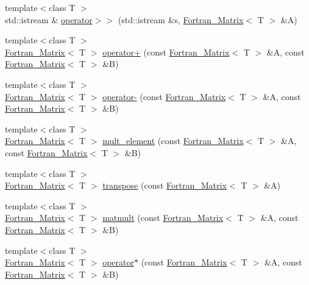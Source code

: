 \begin{DoxyCompactItemize}
{\footnotesize template$<$class T $>$ }\\std::istream \& \hyperlink{namespace_t_n_t_a06559afd57841f2cf098db8e64d36fa0}{operator$>$$>$} (std::istream \&s, \hyperlink{class_t_n_t_1_1_fortran___matrix}{Fortran\_\-Matrix}$<$ T $>$ \&A)
\item 
{\footnotesize template$<$class T $>$ }\\\hyperlink{class_t_n_t_1_1_fortran___matrix}{Fortran\_\-Matrix}$<$ T $>$ \hyperlink{namespace_t_n_t_a8025a7974a165fccf5457b055acfd543}{operator+} (const \hyperlink{class_t_n_t_1_1_fortran___matrix}{Fortran\_\-Matrix}$<$ T $>$ \&A, const \hyperlink{class_t_n_t_1_1_fortran___matrix}{Fortran\_\-Matrix}$<$ T $>$ \&B)
\item 
{\footnotesize template$<$class T $>$ }\\\hyperlink{class_t_n_t_1_1_fortran___matrix}{Fortran\_\-Matrix}$<$ T $>$ \hyperlink{namespace_t_n_t_a8ffd86e3dac4b45866bd5dd6d24f8d4d}{operator-\/} (const \hyperlink{class_t_n_t_1_1_fortran___matrix}{Fortran\_\-Matrix}$<$ T $>$ \&A, const \hyperlink{class_t_n_t_1_1_fortran___matrix}{Fortran\_\-Matrix}$<$ T $>$ \&B)
\item 
{\footnotesize template$<$class T $>$ }\\\hyperlink{class_t_n_t_1_1_fortran___matrix}{Fortran\_\-Matrix}$<$ T $>$ \hyperlink{namespace_t_n_t_a4b7ddb1829794d31797591c8031d92d1}{mult\_\-element} (const \hyperlink{class_t_n_t_1_1_fortran___matrix}{Fortran\_\-Matrix}$<$ T $>$ \&A, const \hyperlink{class_t_n_t_1_1_fortran___matrix}{Fortran\_\-Matrix}$<$ T $>$ \&B)
\item 
{\footnotesize template$<$class T $>$ }\\\hyperlink{class_t_n_t_1_1_fortran___matrix}{Fortran\_\-Matrix}$<$ T $>$ \hyperlink{namespace_t_n_t_a26a8037bc1ceb0f12f38113b037488b4}{transpose} (const \hyperlink{class_t_n_t_1_1_fortran___matrix}{Fortran\_\-Matrix}$<$ T $>$ \&A)
\item 
{\footnotesize template$<$class T $>$ }\\\hyperlink{class_t_n_t_1_1_fortran___matrix}{Fortran\_\-Matrix}$<$ T $>$ \hyperlink{namespace_t_n_t_a2f4c6ff9e27fe318e0bc01be623ff260}{matmult} (const \hyperlink{class_t_n_t_1_1_fortran___matrix}{Fortran\_\-Matrix}$<$ T $>$ \&A, const \hyperlink{class_t_n_t_1_1_fortran___matrix}{Fortran\_\-Matrix}$<$ T $>$ \&B)
\item 
{\footnotesize template$<$class T $>$ }\\\hyperlink{class_t_n_t_1_1_fortran___matrix}{Fortran\_\-Matrix}$<$ T $>$ \hyperlink{namespace_t_n_t_a4c9b0c32113febe2f6331b888a9eea88}{operator$\ast$} (const \hyperlink{class_t_n_t_1_1_fortran___matrix}{Fortran\_\-Matrix}$<$ T $>$ \&A, const \hyperlink{class_t_n_t_1_1_fortran___matrix}{Fortran\_\-Matrix}$<$ T $>$ \&B)

\end{DoxyCompactItemize}
